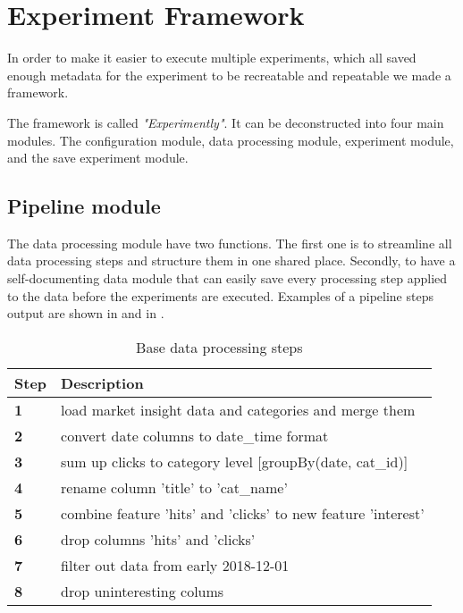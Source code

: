 \section{Experiment Framework}
\label{section:method:experiment-framework}
In order to make it easier to execute multiple experiments, which all saved
enough metadata for the experiment to be recreatable and repeatable we made
a framework.

The framework is called \textit{"Experimently"}. It can be deconstructed into
four main modules. The configuration module, data processing module, experiment module, and the save experiment module.


\subsection{Pipeline module}
\label{section:Method:Pipeline}
The data processing module have two functions.
The first one is to streamline all data processing steps and structure them in one shared place.
Secondly, to have a self-documenting data module that can easily save
every processing step applied to the data before the experiments are executed.
Examples of a pipeline steps output are shown in 
and in .

\begin{table}[h]
  \caption{Base data processing steps}
  \label{table:base_data_processing_steps}
  \begin{tabular}{ll}
    \toprule
    Step       & Description                                                   \\
    \midrule
    \textbf{1} & load market insight data and categories and merge them        \\
    \textbf{2} & convert date columns to date\_time format                     \\
    \textbf{3} & sum up clicks to category level [groupBy(date, cat\_id)]      \\
    \textbf{4} & rename column 'title' to 'cat\_name'                          \\
    \textbf{5} & combine feature 'hits' and 'clicks' to new feature 'interest' \\
    \textbf{6} & drop columns 'hits' and 'clicks'                              \\
    \textbf{7} & filter out data from early 2018-12-01                         \\
    \textbf{8} & drop uninteresting colums                                     \\
    \bottomrule
  \end{tabular}
\end{table}

